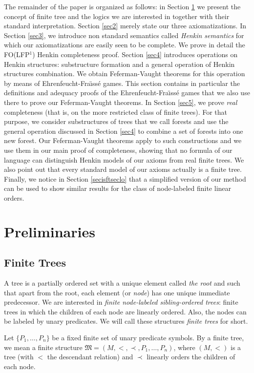 \documentclass{LMCS}
\newcommand{\frM}{\mathfrak{M}}
\newcommand{\folfp}{\textsf{FO(LFP$^1$)}\xspace}
\begin{document}
The remainder of the paper is organized as follows: in Section \ref{sec1} we present the concept of finite tree and the logics we are interested in together with their standard interpretation. 
Section \ref{sec2} merely state our three
axiomatizations. In Section \ref{sec3}, we introduce non standard semantics called \textit{Henkin
semantics} for which our axiomatizations are easily seen to be
complete. We prove in detail the \folfp Henkin completeness proof. Section \ref{sec4} introduces operations on Henkin structures: substructure formation and a general operation of Henkin structures combination. We obtain Feferman-Vaught theorems for this operation by means of Ehrenfeucht-Fra\"{\i}ss\'e games. This section contains in particular the definitions and adequacy proofs of the Ehrenfeucht-Fra\"{\i}ss\'e games that we also use there to prove our Feferman-Vaught theorems.
In Section \ref{sec5}, we prove \textit{real} completeness (that is, on
the more restricted class of finite trees).
For that purpose, we consider substructures of trees
that we call forests and use the general operation discussed in Section \ref{sec4}
to combine a set of forests into one new forest. Our Feferman-Vaught theorems apply to such
constructions and we use them in our main proof of completeness, showing
that no formula of our language can distinguish Henkin models of
our axioms from real finite trees.
We also point out that every standard model of our axioms actually is a finite tree. 
Finally, we notice in Section \ref{secisftseclo} that a simplified version of our method can be used to show similar results for the class of node-labeled finite linear orders.

\section{Preliminaries}
\label{sec1}





\subsection{Finite Trees}


A tree is a partially ordered set with a unique element called \emph{the root} and such that apart from the root, each element (or \emph{node}) has one unique immediate predecessor. We are interested in
\emph{finite node-labeled sibling-ordered trees}: finite trees in which the
children of each node are linearly ordered. Also, the nodes can be
labeled by unary predicates. We will call these structures
\emph{finite trees} for short.
\begin{defi}
  Let $\{P_1, \ldots,
  P_n\}$ be a fixed finite set of unary predicate symbols.  By a finite tree, we mean a finite structure
  $\frM=(M,<,\prec,P_1, \ldots, P_n)$, where $(M,<)$ is a tree (with
  $<$ the descendant relation) and $\prec$ linearly orders the
  children of each node.
\end{defi}
\end{document}
